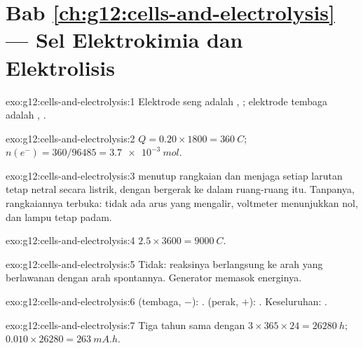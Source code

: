 \section*{Bab \ref{ch:g12:cells-and-electrolysis} --- Sel Elektrokimia dan Elektrolisis}

\begin{solution}{exo:g12:cells-and-electrolysis:1}
Elektrode seng adalah , ; elektrode
tembaga adalah , .
\end{solution}

\begin{solution}{exo:g12:cells-and-electrolysis:2}
$Q = 0.20 \times 1800 = \qty{360}{C}$; $n(e^-) = 360/96485 =
\qty{3.7e-3}{mol}$.
\end{solution}

\begin{solution}{exo:g12:cells-and-electrolysis:3}
 menutup rangkaian dan menjaga setiap larutan tetap netral
secara listrik, dengan  bergerak ke dalam ruang-ruang itu.
Tanpanya, rangkaiannya terbuka: tidak ada arus yang mengalir,
voltmeter menunjukkan nol, dan lampu tetap padam.
\end{solution}

\begin{solution}{exo:g12:cells-and-electrolysis:4}
$2.5 \times 3600 = \qty{9000}{C}$.
\end{solution}

\begin{solution}{exo:g12:cells-and-electrolysis:5}
Tidak: reaksinya berlangsung ke arah yang berlawanan dengan arah
spontannya. Generator memasok energinya.
\end{solution}

\begin{solution}{exo:g12:cells-and-electrolysis:6}
 (tembaga, $-$): .  (perak, $+$):
. Keseluruhan: .
\end{solution}

\begin{solution}{exo:g12:cells-and-electrolysis:7}
Tiga tahun sama dengan $3 \times 365 \times 24 = \qty{26280}{h}$;
$0.010 \times 26280 = \qty{263}{mA.h}$.
\end{solution}

